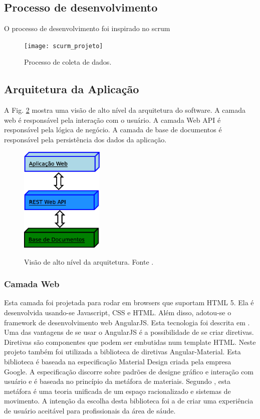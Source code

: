 \documentclass[journal]{IEEEtran}
\begin{document}
\subsection{Processo de desenvolvimento}
O processo de desenvolvimento foi inspirado no scrum \cite{}

\begin{figure}[!t]
	\centering
	{\texttt{[image: scurm\_projeto]}}
	\caption{Processo de coleta de dados.}
	\label{dev_proc}
\end{figure}


\subsection{Arquitetura da Aplicação}
A Fig. \ref{camadas} mostra uma visão de alto nível da
arquitetura do software. A camada web é responsável pela interação com o usuário. 
A camada Web API  é responsável pela lógica de negócio. 
A camada de base de documentos é responsável pela
persistência dos dados da aplicação.
\begin{figure}[!t]
	\centering
	{\includegraphics[width=4cm]{camadas}}
	\caption{Visão de alto nível da arquitetura. Fonte \cite{Lima2015}.}
	\label{camadas}
\end{figure}

\subsubsection{Camada Web}
Esta camada foi projetada para rodar em browsers que suportam HTML 5. Ela é 
desenvolvida usando-se Javascript, CSS e HTML. Além disso, adotou-se o framework de
desenvolvimento web AngularJS. Esta tecnologia foi descrita em \cite{Branas2014}.
Uma das vantagens de se usar o AngularJS é a possibilidade de se criar diretivas.
Diretivas são componentes que podem ser embutidas num template HTML.
Neste projeto também foi utilizada a biblioteca de diretivas Angular-Material.
Esta biblioteca é baseada na especificação Material Design criada pela empresa Google. 
A especificação discorre sobre padrões de designe gráfico e interação com usuário e é baseada 
no princípio da metáfora de materiais. 
Segundo \cite{Google2015a}, esta metáfora é uma teoria unificada de um espaço racionalizado
e sistemas de movimento. A intenção da escolha desta biblioteca foi a de criar
uma experiência de usuário aceitável para profissionais da área de sáude.
\end{document}
